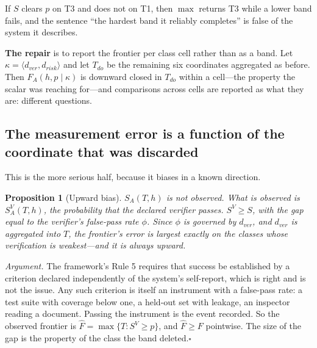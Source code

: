 \documentclass[11pt]{article}
\newtheorem{proposition}{Proposition}
\theoremstyle{definition}
\newcommand{\dver}{\ensuremath{d_{ver}}}
\newcommand{\drisk}{\ensuremath{d_{risk}}}
\newcommand{\kap}{\ensuremath{\kappa}}
\begin{document}
If $S$ clears $p$ on T3 and does not on T1, then $\max$ returns T3 while a lower band fails, and the sentence ``the hardest band it reliably completes'' is false of the system it describes.

\textbf{The repair} is to report the frontier per class cell rather than as a band. Let $\kap=\langle \dver,\drisk\rangle$ and let $T_{do}$ be the remaining six coordinates aggregated as before. Then $F_A(h,p \mid \kap)$ is downward closed in $T_{do}$ within a cell---the property the scalar was reaching for---and comparisons across cells are reported as what they are: different questions.

\subsection{The measurement error is a function of the coordinate that was discarded}\label{sec:bias}

This is the more serious half, because it biases in a known direction.

\begin{proposition}[Upward bias]\label{prop:bias}
$S_A(T,h)$ is not observed. What is observed is $S^V_A(T,h)$, the probability that the declared verifier passes. $S^V \ge S$, with the gap equal to the verifier's false-pass rate $\phi$. Since $\phi$ is governed by \dver{}, and \dver{} is aggregated into $T$, the frontier's error is largest exactly on the classes whose verification is weakest---and it is always upward.
\end{proposition}

\emph{Argument.} The framework's Rule 5 requires that success be established by a criterion declared independently of the system's self-report, which is right and is not the issue. Any such criterion is itself an instrument with a false-pass rate: a test suite with coverage below one, a held-out set with leakage, an inspector reading a document. Passing the instrument is the event recorded. So the observed frontier is $\hat{F}=\max\{T:S^V\ge p\}$, and $\hat{F}\ge F$ pointwise. The size of the gap is the property of the class the band deleted.\hfill$\square$
\end{document}

